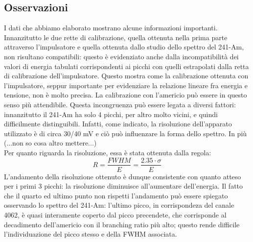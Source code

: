 \documentclass[a4paper,10pt]{article}
\begin{document}
\subsection{Osservazioni}
I dati che abbiamo elaborato mostrano alcune informazioni importanti. Innanzitutto le due rette di calibrazione, quella ottenuta nella prima parte attraverso l'impulsatore e quella ottenuta dallo studio dello spettro del 241-Am, non risultano compatibili: questo è evidenziato anche dalla incompatibilit\`a dei valori di energia tabulati corrispondenti ai picchi con quelli estrapolati dalla retta di calibrazione dell'impulsatore. Questo mostra come la calibrazione ottenuta con l'impulsatore, seppur importante per evidenziare la relazione lineare fra energia e tensione, non \`e molto precisa. La calibrazione con l'americio pu\`o essere in questo senso pi\`u attendibile. Questa incongruenza pu\`o essere legata a diversi fattori: innanzitutto il 241-Am ha solo 4 picchi, per altro molto vicini, e quindi difficilmente distinguibili. Infatti, come indicato, la risoluzione dell'apparato utilizzato è di circa 30/40 mV e ci\`o pu\`o influenzare la forma dello spettro. In pi\`u (...non so cosa altro mettere...)\\
Per quanto riguarda la risoluzione, essa \`e stata ottenuta dalla regola:
\[
R=\frac{FWHM}{E}=\frac{2.35\cdot\sigma}{E}
\]
L'andamento della risoluzione ottenuto \`e dunque consistente con quanto atteso per i primi 3 picchi: la risoluzione diminuisce all'aumentare dell'energia. Il fatto che il quarto ed ultimo punto non rispetti l'andamento pu\`o essere spiegato osservando lo spettro del 241-Am: l'ultimo picco, in corrispondeza del canale 4062, \`e quasi interamente coperto dal picco precendete, che corrisponde al decadimento dell'americio con il branching ratio più alto; questo rende difficile l'individuazione del picco stesso e della FWHM associata. 
\end{document}
